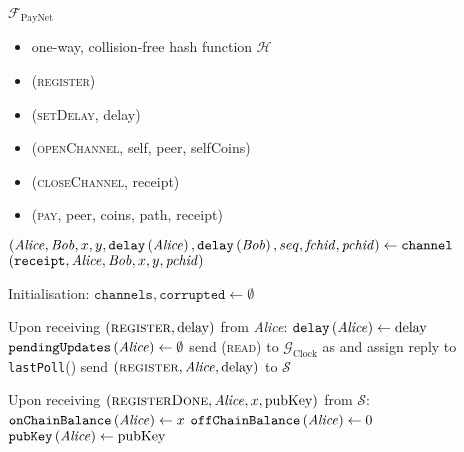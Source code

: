 \begin{functionality}{$\mathcal{F}_{\mathrm{PayNet}}$}
  \label{alg:payfunc}
    \begin{itemize}
      \item one-way, collision-free hash function $\mathcal{H}$
    \end{itemize}

    \begin{itemize}
      \item (\textsc{register})
      \item (\textsc{setDelay}, delay)
      \item (\textsc{openChannel}, self, peer, selfCoins)
      \item (\textsc{closeChannel}, receipt)
      \item (\textsc{pay}, peer, coins, path, receipt)
    \end{itemize}

  \begin{algorithmic}[1]
      \State $\left(\mathit{Alice}, \mathit{Bob}, x, y, \mathtt{delay}\left(\mathit{Alice}\right),
      \mathtt{delay}\left(\mathit{Bob}\right), seq, \mathit{fchid},
      \mathit{pchid}\right) \gets \mathtt{channel}$
      \State \Return $\left(\mathtt{receipt}, \mathit{Alice}, \mathit{Bob}, x, y,
      \mathit{pchid}\right)$
    \EndFunction
    \State

    \State Initialisation:
    \Indent
      \State $\mathtt{channels}, \mathtt{corrupted} \gets \emptyset$
    \EndIndent
    \State

    \State Upon receiving $\left(\textsc{register}, \mathrm{delay}\right)$ from
    \textit{Alice}:
    \Indent
      \State $\mathtt{delay}\left(\mathit{Alice}\right) \gets \mathrm{delay}$
      \State $\mathtt{pendingUpdates}\left(\mathit{Alice}\right) \gets \emptyset$
      \State send (\textsc{read}) to $\mathcal{G}_{\mathrm{Clock}}$ as
      \alice and assign reply to \texttt{lastPoll}(\alice)
      \State send $\left(\textsc{register}, \mathit{Alice}, \mathrm{delay}\right)$ to
      $\mathcal{S}$
    \EndIndent
    \State

    \State Upon receiving $\left(\textsc{registerDone}, \mathit{Alice}, x,
    \mathrm{pubKey}\right)$ from $\mathcal{S}$: 
    \Indent
      \State $\mathtt{onChainBalance}\left(\mathit{Alice}\right) \gets x$
      \State $\mathtt{offChainBalance}\left(\mathit{Alice}\right) \gets 0$
      \State $\mathtt{pubKey}\left(\mathit{Alice}\right) \gets \mathrm{pubKey}$
    \EndIndent
    \State


\end{algorithmic}
\end{functionality}
